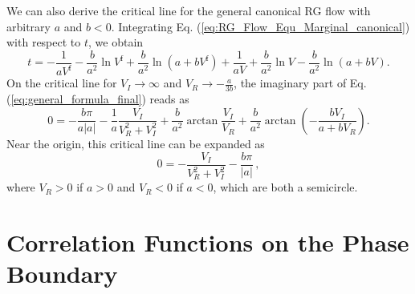 \documentclass[aps,onecolumn,superscriptaddress,notitlepage,longbibliography]{revtex4-1}
\begin{document}
We can also derive the critical line for the general canonical RG flow with arbitrary $a$ and $b<0$. Integrating Eq. (\ref{eq:RG_Flow_Equ_Marginal_canonical}) with respect to $t$, we obtain
\begin{equation}
	t=-\frac{1}{a V^{\mathrm{f}}}-\frac{b}{a^2}\ln{V^\mathrm{f}}+\frac{b}{a^2}\ln{(a+b V^\mathrm{f})}+\frac{1}{a V}+\frac{b}{a^2}\ln{V}-\frac{b}{a^2}\ln{(a+b V)}.
\label{eq:general_formula_final}
\end{equation}
On the critical line for $V_I\to\infty$ and $V_R\to-\frac{a}{3b}$, the imaginary part of Eq. (\ref{eq:general_formula_final}) reads as 
\begin{equation}
	0=-\frac{b\pi}{a|a|}-\frac{1}{a}\frac{V_I}{V_R^2+V_I^2}+\frac{b}{a^2}\arctan{\frac{V_I}{V_R}}+\frac{b}{a^2}\arctan{(-\frac{b V_I}{a+b V_R})}.
\label{eq:imaginary_part_boundary}
\end{equation}
Near the origin, this critical line can be expanded as 
\begin{equation}
0=-\frac{V_I}{V_R^2+V_I^2}-\frac{b\pi}{|a|}\,,%
\end{equation}
where $V_R>0$ if $a>0$ and $V_R<0$ if $a<0$, which are both a semicircle.

\section{Correlation Functions on the Phase Boundary}\label{SectionOn}
\end{document}
